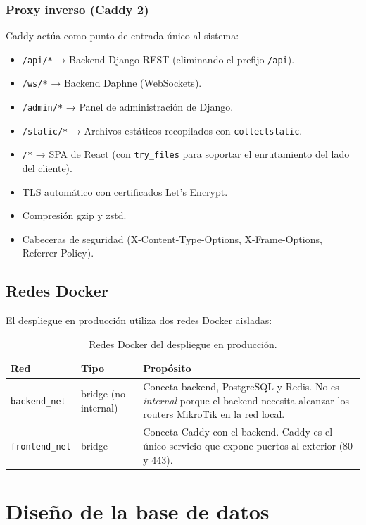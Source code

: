 \documentclass[12pt, a4paper, twoside]{article}
\begin{document}
\subsubsection{Proxy inverso (Caddy 2)}

Caddy actúa como punto de entrada único al sistema:

\begin{itemize}
  \item \texttt{/api/*} → Backend Django REST (eliminando el prefijo \texttt{/api}).
  \item \texttt{/ws/*} → Backend Daphne (WebSockets).
  \item \texttt{/admin/*} → Panel de administración de Django.
  \item \texttt{/static/*} → Archivos estáticos recopilados con \texttt{collectstatic}.
  \item \texttt{/*} → SPA de React (con \texttt{try\_files} para soportar el enrutamiento del lado del cliente).
  \item TLS automático con certificados Let's Encrypt.
  \item Compresión gzip y zstd.
  \item Cabeceras de seguridad (X-Content-Type-Options, X-Frame-Options, Referrer-Policy).
\end{itemize}

\subsection{Redes Docker}

El despliegue en producción utiliza dos redes Docker aisladas:

\begin{table}[H]
\centering
\begin{tabularx}{\textwidth}{llX}
  \toprule
  \textbf{Red} & \textbf{Tipo} & \textbf{Propósito} \\
  \midrule
  \texttt{backend\_net} & bridge (no internal) & Conecta backend, PostgreSQL y Redis. No es \textit{internal} porque el backend necesita alcanzar los routers MikroTik en la red local. \\
  \texttt{frontend\_net} & bridge & Conecta Caddy con el backend. Caddy es el único servicio que expone puertos al exterior (80 y 443). \\
  \bottomrule
\end{tabularx}
\caption{Redes Docker del despliegue en producción.}
\end{table}

\section{Diseño de la base de datos}
\end{document}

